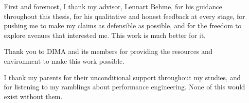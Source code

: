 First and foremost, I thank my advisor, Lennart Behme, for his guidance throughout this thesis, for his qualitative and honest feedback at every stage, for pushing me to make my claims as defensible as possible, and for the freedom to explore avenues that interested me. This work is much better for it.

Thank you to DIMA and its members for providing the resources and environment to make this work possible.

I thank my parents for their unconditional support throughout my studies, and for listening to my ramblings about performance engineering. None of this would exist without them.